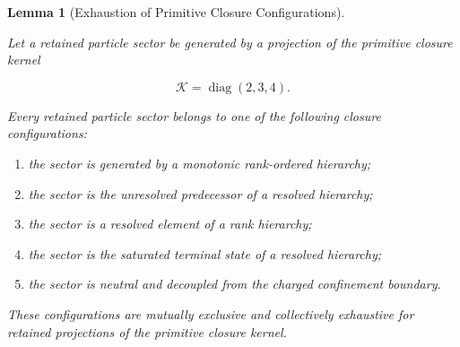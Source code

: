 \documentclass[11pt]{article}
\newtheorem{lemma}[theorem]{Lemma}
\theoremstyle{definition}
\theoremstyle{remark}
\begin{document}

\begin{lemma}[Exhaustion of Primitive Closure Configurations]
\label{lem:exhaustion_of_closure_configurations}

Let a retained particle sector be generated by a projection of
the primitive closure kernel

\begin{equation}
\mathcal K
=
\operatorname{diag}(2,3,4).
\end{equation}

Every retained particle sector belongs to one of the following
closure configurations:

\begin{enumerate}

\item the sector is generated by a monotonic rank-ordered
hierarchy;

\item the sector is the unresolved predecessor of a resolved
hierarchy;

\item the sector is a resolved element of a rank hierarchy;

\item the sector is the saturated terminal state of a resolved
hierarchy;

\item the sector is neutral and decoupled from the charged
confinement boundary.

\end{enumerate}

These configurations are mutually exclusive and collectively
exhaustive for retained projections of the primitive closure
kernel.

\end{lemma}
\end{document}
